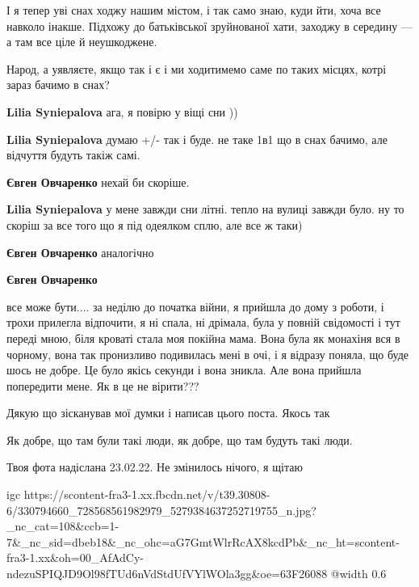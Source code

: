 \begin{itemize}
І я тепер уві снах ходжу нашим містом, і так само знаю, куди йти, хоча все
навколо інакше. Підхожу до батьківської зруйнованої хати, заходжу в середину —
а там все ціле й неушкоджене.


Народ, а уявляєте, якщо так і є і ми ходитимемо саме по таких місцях, котрі зараз бачимо в снах?

\textbf{Lilia Syniepalova} ага, я повірю у віщі сни ))

\textbf{Lilia Syniepalova} думаю +/- так і буде. не таке 1в1 що в снах бачимо, але відчуття будуть такіж самі.

\textbf{Євген Овчаренко} нехай би скоріше.

\textbf{Lilia Syniepalova} у мене завжди сни літні. тепло на вулиці завжди було. ну то скоріш за все того що я під одеялком сплю, але все ж таки)

\textbf{Євген Овчаренко} аналогічно

\textbf{Євген Овчаренко} 

все може бути.... за неділю до початка війни, я прийшла до дому з роботи, і
трохи прилегла відпочити, я ні спала, ні дрімала, була у повній свідомості і
тут переді мною, біля кроваті стала моя покійна мама. Вона була як монахіня вся
в чорному, вона так пронизливо подивилась мені в очі, і я відразу поняла, що
буде шось не добре. Це було якісь секунди і вона зникла. Але вона прийшла
попередити мене. Як в це не вірити???

\end{itemize} %


Дякую що зісканував мої думки і написав цього поста. Якось так


Як добре, що там були такі люди, як добре, що там будуть такі люди.


Твоя фота надіслана 23.02.22. Не змінилось нічого, я щітаю

\ifcmt
  igc https://scontent-fra3-1.xx.fbcdn.net/v/t39.30808-6/330794660_728568561982979_5279384637252719755_n.jpg?_nc_cat=108&ccb=1-7&_nc_sid=dbeb18&_nc_ohc=aG7GmtWlrRcAX8kcdPb&_nc_ht=scontent-fra3-1.xx&oh=00_AfAdCy-ndezuSPIQJD9Ol98fTUd6nVdStdUfVYlWOla3gg&oe=63F26088
  @width 0.6
\fi

